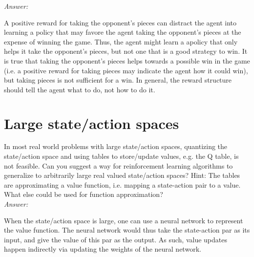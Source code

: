 \textit{Answer:}

A positive reward for taking the opponent's pieces can distract the agent into learning a policy that may favore the agent taking the opponent's pieces at the expense of winning the game.
Thus, the agent might learn a apolicy that only helps it take the opponent's pieces, but not one that is a good strategy to win.
It is true that taking the opponent's pieces helps towards a possible win in the game (i.e. a positive reward for taking pieces may indicate the agent how it could win), but taking pieces is not sufficient for a win.
In general, the reward structure should tell the agent what to do, not how to do it.

\section{Large state/action spaces}
In most real world problems with large state/action spaces, quantizing the state/action space and using tables to store/update values, e.g. the Q table, is not feasible.
Can you suggest a way for reinforcement learning algorithms to generalize to arbitrarily large real valued state/action spaces?
Hint: The tables are approximating a value function, i.e. mapping a state-action pair to a value.
What else could be used for function approximation?\\

\textit{Answer:}

When the state/action space is large, one can use a neural network to represent the value function.
The neural network would thus take the state-action par as its input, and give the value of this par as the output.
As such, value updates happen indirectly via updating the weights of the neural network.



